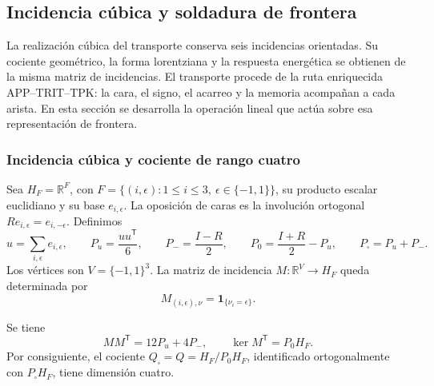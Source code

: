 
\subsection{Incidencia cúbica y soldadura de frontera}
\label{vii:sec:pantalla-respuesta}

La realización cúbica del transporte conserva seis incidencias orientadas.
Su cociente geométrico, la forma lorentziana y la respuesta energética
se obtienen de la misma matriz de incidencias. El transporte procede de
la ruta enriquecida APP--TRIT--TPK: la cara, el signo, el acarreo y la
memoria acompañan a cada arista. En esta sección se desarrolla la
operación lineal que actúa sobre esa representación de frontera.

\subsubsection{Incidencia cúbica y cociente de rango cuatro}
\label{vii:sec:cociente-pantalla}

Sea \(H_F=\mathbb R^F\), con
\(F=\{(i,\epsilon):1\leq i\leq3,\ \epsilon\in\{-1,1\}\}\),
su producto escalar euclidiano y su base \(e_{i,\epsilon}\).
La oposición de caras es la involución ortogonal
\(Re_{i,\epsilon}=e_{i,-\epsilon}\). Definimos
\[
 u=\sum_{i,\epsilon}e_{i,\epsilon},\qquad
 P_u=\frac{uu^{\mathsf T}}6,\qquad P_-=\frac{I-R}{2},\qquad
 P_0=\frac{I+R}{2}-P_u,\qquad P_\square=P_u+P_-.
\]
Los vértices son \(V=\{-1,1\}^3\). La matriz de incidencia
\(M:\mathbb R^V\longrightarrow H_F\) queda determinada por
\[
 M_{(i,\epsilon),\nu}=\mathbf1_{\{\nu_i=\epsilon\}}.
\]

\begin{proposition}
\label{vii:prop:incidencia}
Se tiene
\[
 MM^{\mathsf T}=12P_u+4P_-,
 \qquad
 \ker M^{\mathsf T}=P_0H_F.
\]
Por consiguiente, el cociente
\(Q_\square=Q=H_F/P_0H_F\), identificado ortogonalmente con
\(P_\square H_F\), tiene dimensión cuatro.
\end{proposition}

